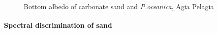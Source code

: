 \documentclass[10pt, a4paper]{article}
\begin{document}
\begin{figure}[h]
	\centering
	\caption{Bottom albedo of carbonate sand and \textit{P.oceanica}, Agia Pelagia}
	\label{fig:34}
\end{figure}
\pagebreak

\paragraph{Spectral discrimination of sand}
\end{document}
